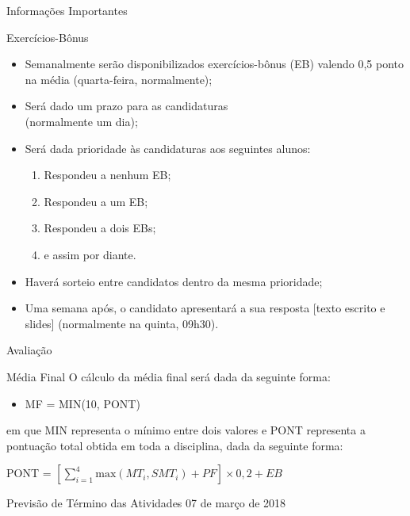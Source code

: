 \documentclass[xcolor=dvipsnames,table]{beamer}
\begin{document}
	 \begin{frame}{Informações Importantes}
		\begin{block}{Exercícios-Bônus}
			\begin{itemize}
				\item Semanalmente serão disponibilizados exercícios-bônus (EB) valendo 0,5 ponto na média (quarta-feira, normalmente); \pause
				\item Será dado um prazo para as candidaturas\\
				(normalmente um dia); \pause
				\item Será dada prioridade às candidaturas aos seguintes alunos: \pause
				\begin{enumerate}
					\item Respondeu a nenhum EB; \pause
					\item Respondeu a um EB; \pause
					\item Respondeu a dois EBs; \pause
					\item e assim por diante.
				\end{enumerate} \pause
				\item Haverá sorteio entre candidatos dentro da mesma prioridade; \pause
				\item Uma semana após, o candidato apresentará a sua resposta [texto escrito e slides] (normalmente na quinta, 09h30).
			\end{itemize}
		\end{block}
	\end{frame}
	
	\begin{frame}{Avaliação}
		\begin{block}{Média Final}
			O cálculo da média final será dada da seguinte forma:
			\begin{itemize}
				\item MF = MIN(10, PONT)
			\end{itemize}
			em que MIN representa o mínimo entre dois valores e PONT representa a pontuação total obtida em toda a disciplina, dada da seguinte forma:
			\begin{center}
				PONT = $\left[ \sum\limits_{i=1}^{4} \mbox{max}(MT_i, SMT_i) + PF \right] \times 0,2 + EB$
			\end{center}
		\end{block} \pause
		\begin{exampleblock}{Previsão de Término das Atividades}
			07 de março de 2018
		\end{exampleblock}
	\end{frame}
	
\end{document}
